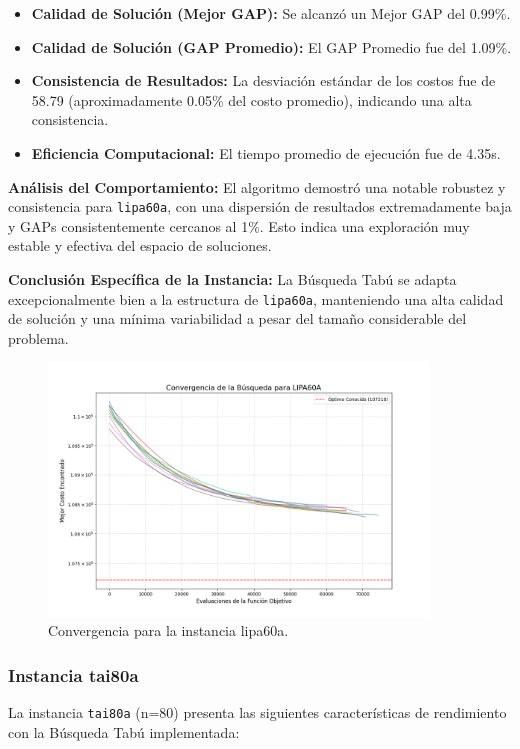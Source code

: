 \documentclass[12pt, a4paper]{article}
\begin{document}
\begin{itemize}
    \item \textbf{Calidad de Solución (Mejor GAP):} Se alcanzó un Mejor GAP del 0.99\%.
    \item \textbf{Calidad de Solución (GAP Promedio):} El GAP Promedio fue del 1.09\%.
    \item \textbf{Consistencia de Resultados:} La desviación estándar de los costos fue de 58.79 (aproximadamente 0.05\% del costo promedio), indicando una alta consistencia.
    \item \textbf{Eficiencia Computacional:} El tiempo promedio de ejecución fue de 4.35s.
\end{itemize}

\textbf{Análisis del Comportamiento:}
El algoritmo demostró una notable robustez y consistencia para \texttt{lipa60a}, con una dispersión de resultados extremadamente baja y GAPs consistentemente cercanos al 1\%. Esto indica una exploración muy estable y efectiva del espacio de soluciones.

\textbf{Conclusión Específica de la Instancia:}
La Búsqueda Tabú se adapta excepcionalmente bien a la estructura de \texttt{lipa60a}, manteniendo una alta calidad de solución y una mínima variabilidad a pesar del tamaño considerable del problema.
\begin{figure}[H]
\centering
\includegraphics[width=0.9\textwidth]{../results/graphs/lipa60a_convergence.png}
\caption{Convergencia para la instancia lipa60a.}
\label{fig:lipa60a_conv}
\end{figure}

\newpage
\subsubsection{Instancia tai80a}
La instancia \texttt{tai80a} (n=80) presenta las siguientes características de rendimiento con la Búsqueda Tabú implementada:
\end{document}
